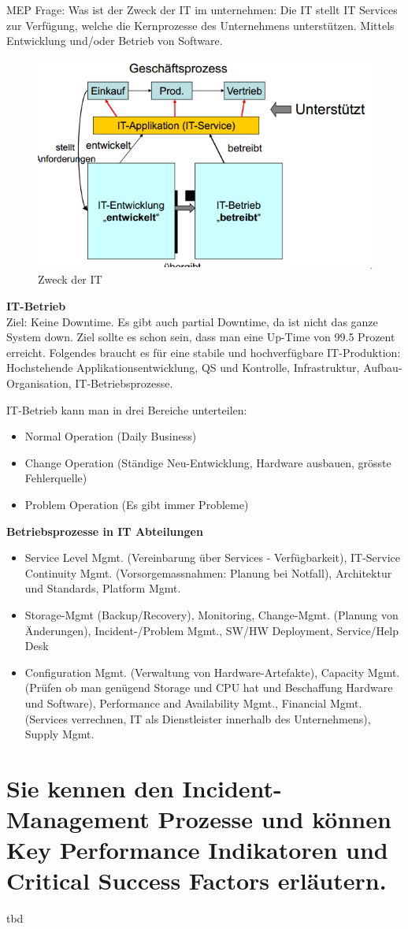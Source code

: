 MEP Frage: Was ist der Zweck der IT im unternehmen:
\label{zweck-der-it-im-unternehmen}
Die IT stellt IT Services zur Verfügung, welche die Kernprozesse des Unternehmens unterstützen. Mittels Entwicklung und/oder Betrieb von Software.

\begin{figure}[h!]
	\centering
	\includegraphics{fig/zweck-der-it}
	\caption{Zweck der IT}
\end{figure}

\textbf{IT-Betrieb}\\
Ziel: Keine Downtime. Es gibt auch partial Downtime, da ist nicht das ganze System down. Ziel sollte es schon sein, dass man eine Up-Time von 99.5 Prozent erreicht. Folgendes braucht es für eine stabile und hochverfügbare IT-Produktion: Hochstehende Applikationsentwicklung, QS und Kontrolle, Infrastruktur, Aufbau-Organisation, IT-Betriebsprozesse.

IT-Betrieb kann man in drei Bereiche unterteilen: 

\begin{itemize}
	\item Normal Operation (Daily Business)
	\item Change Operation (Ständige Neu-Entwicklung, Hardware ausbauen, grösste Fehlerquelle)
	\item Problem Operation (Es gibt immer Probleme)
\end{itemize}

\textbf{Betriebsprozesse in IT Abteilungen}
\begin{itemize}
	\item Service Level Mgmt. (Vereinbarung über Services - Verfügbarkeit), IT-Service Continuity Mgmt. (Vorsorgemassnahmen: Planung bei Notfall), Architektur und Standards, Platform Mgmt.
	
	\item Storage-Mgmt (Backup/Recovery), Monitoring, Change-Mgmt. (Planung von Änderungen),  Incident-/Problem Mgmt., SW/HW Deployment, Service/Help Desk
	
	\item Configuration Mgmt. (Verwaltung von Hardware-Artefakte), Capacity Mgmt. (Prüfen ob man genügend Storage und CPU hat und Beschaffung Hardware und Software), Performance and Availability Mgmt., Financial Mgmt. (Services verrechnen, IT als Dienstleister innerhalb des Unternehmens), Supply Mgmt.
\end{itemize}

\section{Sie kennen den Incident-Management Prozesse und
	können Key Performance Indikatoren und Critical Success
	Factors erläutern.}
tbd


